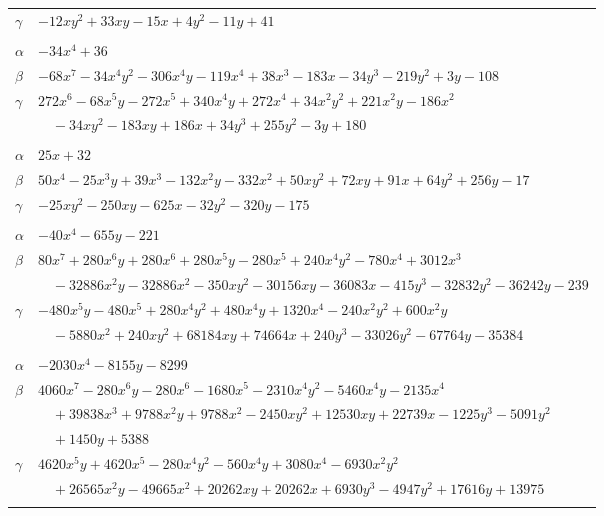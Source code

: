 \documentclass[11pt]{article}
\begin{document}
\begin{longtable}{@{}ll@{}}
$\gamma$ & $-12xy^{2}+33xy-15x+4y^{2}-11y+41$\\
\addlinespace[3pt]
\multicolumn{2}{@{}l}{$\{i,j\}=\{13,19\}$, $k_{ij}=2^{2}\cdot 3^{2}$}\\
$\alpha$ & $-34x^{4}+36$\\
$\beta$ & $-68x^{7}-34x^{4}y^{2}-306x^{4}y-119x^{4}+38x^{3}-183x-34y^{3}-219y^{2}+3y-108$\\
$\gamma$ & $272x^{6}-68x^{5}y-272x^{5}+340x^{4}y+272x^{4}+34x^{2}y^{2}+221x^{2}y-186x^{2}$\\
 & $\quad -34xy^{2}-183xy+186x+34y^{3}+255y^{2}-3y+180$\\
\addlinespace[3pt]
\multicolumn{2}{@{}l}{$\{i,j\}=\{14,17\}$, $k_{ij}=7^{2}$}\\
$\alpha$ & $25x+32$\\
$\beta$ & $50x^{4}-25x^{3}y+39x^{3}-132x^{2}y-332x^{2}+50xy^{2}+72xy+91x+64y^{2}+256y-17$\\
$\gamma$ & $-25xy^{2}-250xy-625x-32y^{2}-320y-175$\\
\addlinespace[3pt]
\multicolumn{2}{@{}l}{$\{i,j\}=\{15,7\}$, $k_{ij}=2\cdot 3^{2}$}\\
$\alpha$ & $-40x^{4}-655y-221$\\
$\beta$ & $80x^{7}+280x^{6}y+280x^{6}+280x^{5}y-280x^{5}+240x^{4}y^{2}-780x^{4}+3012x^{3}$\\
 & $\quad -32886x^{2}y-32886x^{2}-350xy^{2}-30156xy-36083x-415y^{3}-32832y^{2}-36242y-239$\\
$\gamma$ & $-480x^{5}y-480x^{5}+280x^{4}y^{2}+480x^{4}y+1320x^{4}-240x^{2}y^{2}+600x^{2}y$\\
 & $\quad -5880x^{2}+240xy^{2}+68184xy+74664x+240y^{3}-33026y^{2}-67764y-35384$\\
\addlinespace[3pt]
\multicolumn{2}{@{}l}{$\{i,j\}=\{15,18\}$, $k_{ij}=2^{5}\cdot 3^{2}$}\\
$\alpha$ & $-2030x^{4}-8155y-8299$\\
$\beta$ & $4060x^{7}-280x^{6}y-280x^{6}-1680x^{5}-2310x^{4}y^{2}-5460x^{4}y-2135x^{4}$\\
 & $\quad +39838x^{3}+9788x^{2}y+9788x^{2}-2450xy^{2}+12530xy+22739x-1225y^{3}-5091y^{2}$\\
 & $\quad +1450y+5388$\\
$\gamma$ & $4620x^{5}y+4620x^{5}-280x^{4}y^{2}-560x^{4}y+3080x^{4}-6930x^{2}y^{2}$\\
 & $\quad +26565x^{2}y-49665x^{2}+20262xy+20262x+6930y^{3}-4947y^{2}+17616y+13975$\\
\addlinespace[3pt]
\multicolumn{2}{@{}l}{$\{i,j\}=\{16,18\}$, $k_{ij}=1$}\\

\end{longtable}
\end{document}
